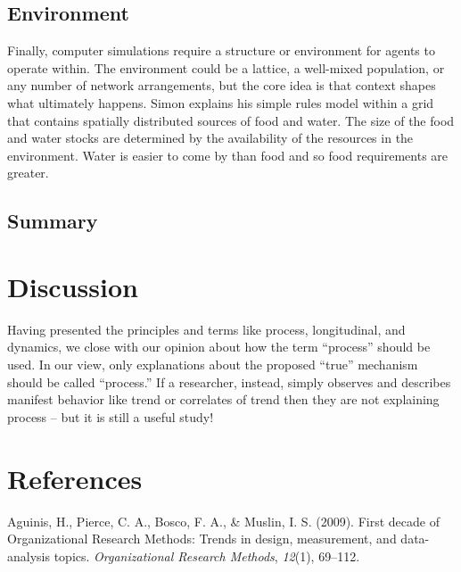 \documentclass[english,,man]{apa6}
\theoremstyle{definition}
\theoremstyle{definition}
\theoremstyle{definition}
\theoremstyle{remark}
\begin{document}
\hypertarget{environment}{%
\subsection{Environment}\label{environment}}

Finally, computer simulations require a structure or environment for
agents to operate within. The environment could be a lattice, a
well-mixed population, or any number of network arrangements, but the
core idea is that context shapes what ultimately happens. Simon explains
his simple rules model within a grid that contains spatially distributed
sources of food and water. The size of the food and water stocks are
determined by the availability of the resources in the environment.
Water is easier to come by than food and so food requirements are
greater.

\hypertarget{summary-4}{%
\subsection{Summary}\label{summary-4}}

\hypertarget{discussion}{%
\section{Discussion}\label{discussion}}

Having presented the principles and terms like process, longitudinal,
and dynamics, we close with our opinion about how the term
\enquote{process} should be used. In our view, only explanations about
the proposed \enquote{true} mechanism should be called
\enquote{process.} If a researcher, instead, simply observes and
describes manifest behavior like trend or correlates of trend then they
are not explaining process -- but it is still a useful study!

\newpage

\hypertarget{references}{%
\section{References}\label{references}}

\setlength{\parindent}{-0.5in}
\setlength{\leftskip}{0.5in}

\hypertarget{refs}{}
\leavevmode\hypertarget{ref-aguinis_first_2009}{}%
Aguinis, H., Pierce, C. A., Bosco, F. A., \& Muslin, I. S. (2009). First
decade of Organizational Research Methods: Trends in design,
measurement, and data-analysis topics. \emph{Organizational Research
Methods}, \emph{12}(1), 69--112.
\end{document}
